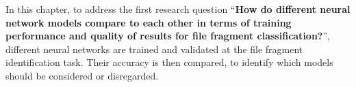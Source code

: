 
In this chapter, to address the first research question ``\textbf{How do different neural network models compare to each other in terms of training performance and quality of results for file fragment classification?}'', different neural networks are trained and validated at the file fragment identification task. Their accuracy is then compared, to identify which models should be considered or disregarded.
